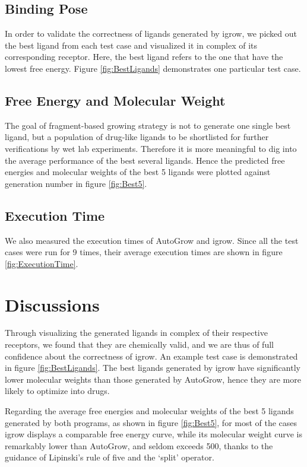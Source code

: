 \documentclass[10pt, conference, compsocconf]{IEEEtran}
\begin{document}
\subsection{Binding Pose}

In order to validate the correctness of ligands generated by igrow, we picked out the best ligand from each test case and visualized it in complex of its corresponding receptor. Here, the best ligand refers to the one that have the lowest free energy.
Figure \ref{fig:BestLigands} demonstrates one particular test case.

\subsection{Free Energy and Molecular Weight}

The goal of fragment-based growing strategy is not to generate one single best ligand, but a population of drug-like ligands to be shortlisted for further verifications by wet lab experiments. Therefore it is more meaningful to dig into the average performance of the best several ligands. Hence the predicted free energies and molecular weights of the best 5 ligands were plotted against generation number in figure \ref{fig:Best5}.

\subsection{Execution Time}

We also measured the execution times of AutoGrow and igrow. Since all the test cases were run for 9 times, their average execution times are shown in figure \ref{fig:ExecutionTime}.

\section{Discussions}

Through visualizing the generated ligands in complex of their respective receptors, we found that they are chemically valid, and we are thus of full confidence about the correctness of igrow. An example test case is demonstrated in figure \ref {fig:BestLigands}.
The best ligands generated by igrow have significantly lower molecular weights than those generated by AutoGrow, hence they are more likely to optimize into drugs.

Regarding the average free energies and molecular weights of the best 5 ligands generated by both programs, as shown in figure \ref{fig:Best5}, for most of the cases igrow displays a comparable free energy curve, while its molecular weight curve is remarkably lower than AutoGrow, and seldom exceeds 500, thanks to the guidance of Lipinski's rule of five and the `split' operator.
\end{document}
